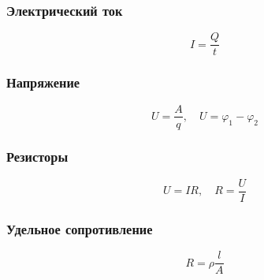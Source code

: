 \documentclass[12pt, a4paper]{article}
\begin{document}
\subsubsection*{Электрический ток}

\[
I = \frac{Q}{t}
\]

\subsubsection*{Напряжение}

\[
U = \frac{A}{q}, \quad U = \varphi_1 - \varphi_2
\]

\subsubsection*{Резисторы}

\[
U = IR, \quad R = \frac{U}{I}
\]

\subsubsection*{Удельное сопротивление}

\[
R = \rho \frac{l}{A}
\]
\end{document}
